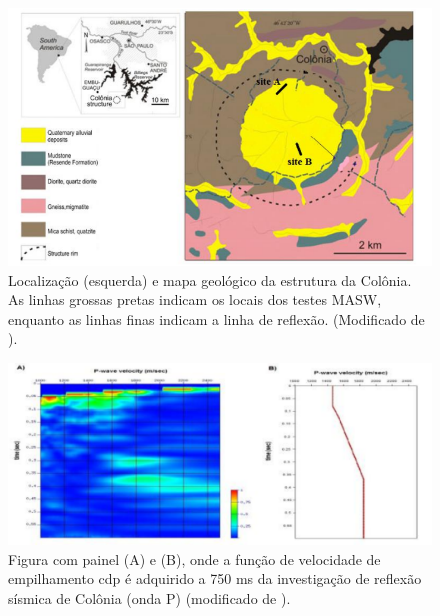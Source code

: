 \documentclass[smallextended]{svjour3}       %
\begin{document}
\begin{figure}[!hbtp]
  \begin{center}
  \includegraphics[scale=0.8]{Figures/fig1.png}
  \end{center}
  \caption{Localização (esquerda) e mapa geológico da estrutura da Colônia. As linhas grossas pretas indicam os locais dos testes MASW, enquanto as linhas finas indicam a linha de reflexão. (Modificado de \citealp{riccomini2011colonia}).
  }
  \label{geologia}
\end{figure}

\begin{figure}[!hbtp]
  \begin{center}
  
  \includegraphics[scale=0.5]{Figures/fig2.png}
  \end{center}
  \caption{Figura com painel (A) e (B), onde a função de velocidade de empilhamento cdp é adquirido a 750 ms da investigação de reflexão sísmica de Colônia (onda P) (modificado de \citealp{riccomini2011colonia}).
  }
  \label{fun_vel}
\end{figure}

\end{document}

